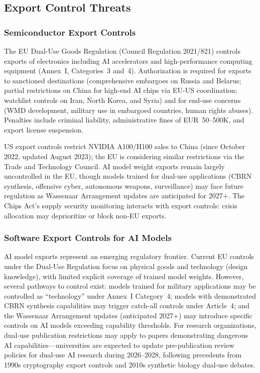 \documentclass[11pt,a4paper]{article}
\begin{document}
\subsection{Export Control Threats}

\subsubsection{Semiconductor Export Controls}

The EU Dual-Use Goods Regulation (Council Regulation 2021/821) controls exports of electronics including AI accelerators and high-performance computing equipment (Annex~I, Categories~3 and~4). Authorization is required for exports to sanctioned destinations (comprehensive embargoes on Russia and Belarus; partial restrictions on China for high-end AI chips via EU-US coordination; watchlist controls on Iran, North Korea, and Syria) and for end-use concerns (WMD development, military use in embargoed countries, human rights abuses). Penalties include criminal liability, administrative fines of EUR~50--500K, and export license suspension.

US export controls restrict NVIDIA A100/H100 sales to China (since October 2022, updated August 2023); the EU is considering similar restrictions via the Trade and Technology Council. AI model weight exports remain largely uncontrolled in the EU, though models trained for dual-use applications (CBRN synthesis, offensive cyber, autonomous weapons, surveillance) may face future regulation as Wassenaar Arrangement updates are anticipated for 2027+. The Chips Act's supply security monitoring interacts with export controls: crisis allocation may deprioritize or block non-EU exports.

\subsubsection{Software Export Controls for AI Models}

AI model exports represent an emerging regulatory frontier. Current EU controls under the Dual-Use Regulation focus on physical goods and technology (design knowledge), with limited explicit coverage of trained model weights. However, several pathways to control exist: models trained for military applications may be controlled as ``technology'' under Annex~I Category~4; models with demonstrated CBRN synthesis capabilities may trigger catch-all controls under Article~4; and the Wassenaar Arrangement updates (anticipated 2027+) may introduce specific controls on AI models exceeding capability thresholds. For research organizations, dual-use publication restrictions may apply to papers demonstrating dangerous AI capabilities---universities are expected to update pre-publication review policies for dual-use AI research during 2026--2028, following precedents from 1990s cryptography export controls and 2010s synthetic biology dual-use debates.
\end{document}
